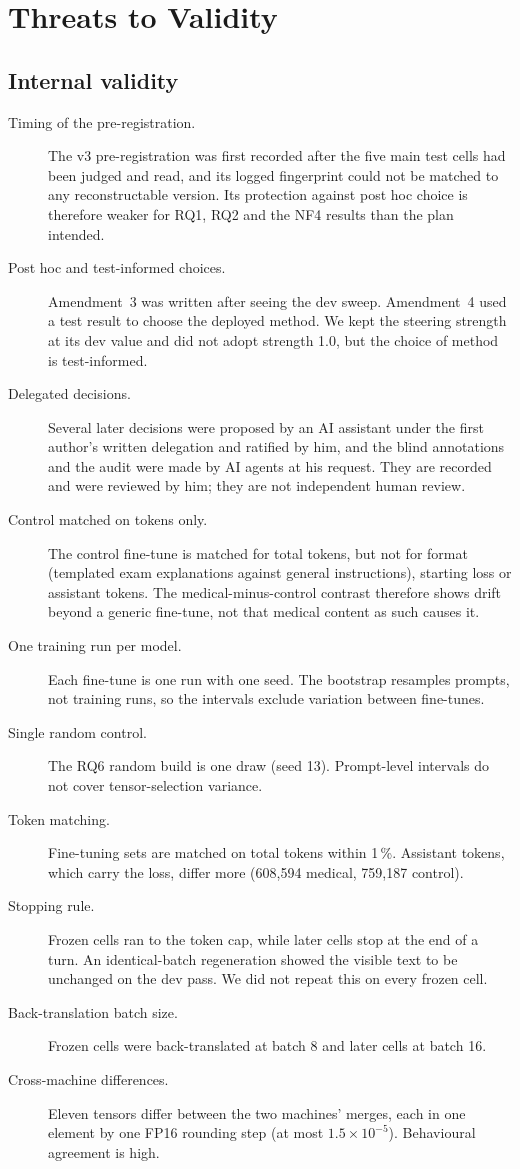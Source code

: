 \section{Threats to Validity}\label{sec:threats}

\subsection{Internal validity}
\begin{description}
\item[Timing of the pre-registration.] The v3 pre-registration was first recorded after the five main test cells had been judged and read, and its logged fingerprint could not be matched to any reconstructable version. Its protection against post hoc choice is therefore weaker for RQ1, RQ2 and the NF4 results than the plan intended.
\item[Post hoc and test-informed choices.] Amendment~3 was written after seeing the dev sweep. Amendment~4 used a test result to choose the deployed method. We kept the steering strength at its dev value and did not adopt strength 1.0, but the choice of method is test-informed.
\item[Delegated decisions.] Several later decisions were proposed by an AI assistant under the first author's written delegation and ratified by him, and the blind annotations and the audit were made by AI agents at his request. They are recorded and were reviewed by him; they are not independent human review.
\item[Control matched on tokens only.] The control fine-tune is matched for total tokens, but not for format (templated exam explanations against general instructions), starting loss or assistant tokens. The medical-minus-control contrast therefore shows drift beyond a generic fine-tune, not that medical content as such causes it.
\item[One training run per model.] Each fine-tune is one run with one seed. The bootstrap resamples prompts, not training runs, so the intervals exclude variation between fine-tunes.
\item[Single random control.] The RQ6 random build is one draw (seed 13). Prompt-level intervals do not cover tensor-selection variance.
\item[Token matching.] Fine-tuning sets are matched on total tokens within 1\,\%. Assistant tokens, which carry the loss, differ more (608,594 medical, 759,187 control).
\item[Stopping rule.] Frozen cells ran to the token cap, while later cells stop at the end of a turn. An identical-batch regeneration showed the visible text to be unchanged on the dev pass. We did not repeat this on every frozen cell.
\item[Back-translation batch size.] Frozen cells were back-translated at batch 8 and later cells at batch 16. %
\item[Cross-machine differences.] Eleven tensors differ between the two machines' merges, each in one element by one FP16 rounding step (at most $1.5\times10^{-5}$). Behavioural agreement is high.
\end{description}

